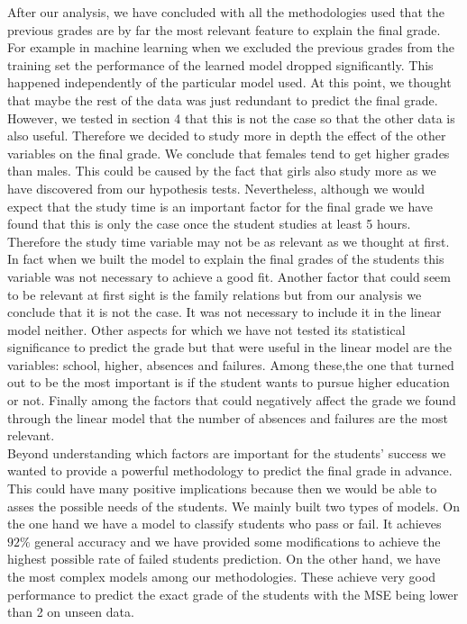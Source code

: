 \documentclass[a4paper, 11pt]{article}
\theoremstyle{definition}
\numberwithin{equation}{section}		%
\numberwithin{table}{section}				%
\begin{document}
After our analysis, we have concluded with all the methodologies used that the previous grades are by far the most relevant feature to explain the final grade. For example in machine learning when we excluded the previous grades from the training set the performance of the learned model dropped significantly. This happened independently of the particular model used. At this point, we thought that maybe the rest of the data was just redundant to predict the final grade. However, we tested in section 4 that this is not the case so that the other data is also useful. Therefore we decided to study more in depth the effect of the other variables on the final grade. We conclude that females tend to get higher grades than males. This could be caused by the fact that girls also study more as we have discovered from our hypothesis tests. Nevertheless, although we would expect that the study time is an important factor for the final grade we have found that this is only the case once the student studies at least 5 hours. Therefore the study time variable may not be as relevant as we thought at first. In fact when we built the model to explain the final grades of the students this variable was not necessary to achieve a good fit. Another factor that could seem to be relevant at first sight is the family relations but from our analysis we conclude that it is not the case. It was not necessary to include it in the linear model neither. Other aspects for which we have not tested its statistical significance to predict the grade but that were useful in the linear model are the variables: school, higher, absences and failures. Among these,the one that turned out to be the most important is if the student wants to pursue higher education or not. Finally among the factors that could negatively affect the grade we found through the linear model that the number of absences and failures are the most relevant.
\\[0.3in]
Beyond understanding which factors are important for the students' success we wanted to provide a powerful methodology to predict the final grade in advance. This could have many positive implications because then we would be able to asses the possible needs of the students. We mainly built two types of models. On the one hand we have a model to classify students who pass or fail. It achieves $92\%$ general accuracy and we have provided some modifications to achieve the highest possible rate of failed students prediction. On the other hand, we have the most complex models among our methodologies. These achieve very good performance to predict the exact grade of the students with the MSE being lower than 2 on unseen data.
\bigskip
\end{document}
